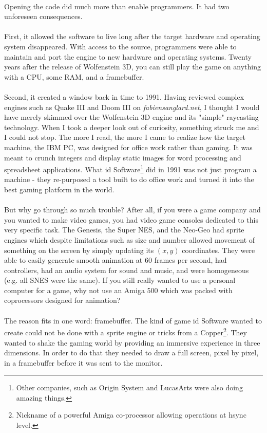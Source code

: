 \\
Opening the code did much more than enable programmers. It had two unforeseen consequences.\\
\\
First, it allowed the software to live long after the target hardware and operating system disappeared. With access to the source, programmers were able to maintain and port the engine to new hardware and operating systems. Twenty years after the release of Wolfenstein 3D, you can still play the game on anything with a CPU, some RAM, and a framebuffer. \\
\\
Second, it created a window back in time to 1991. Having reviewed complex engines such as Quake III and Doom III on \emph{fabiensanglard.net}, I thought I would have merely skimmed over the Wolfenstein 3D engine and its "simple" raycasting technology. When I took a deeper look out of curiosity, something struck me and I could not stop. The more I read, the more I came to realize how the target machine, the IBM PC, was designed for office work rather than gaming. It was meant to crunch integers and display static images for word processing and spreadsheet applications. 
What id Software\footnote{Other companies, such as Origin System and LucasArts were also doing amazing things.} did in 1991 was not just program a machine - they re-purposed a tool built to do office work and turned it into the best gaming platform in the world.\\
\\
But why go through so much trouble? After all, if you were a game company and you wanted to make video games, you had video game consoles dedicated to this very specific task. The Genesis, the Super NES, and the Neo-Geo had sprite engines\label{sprite_engine_ref} which despite limitations such as size and number allowed movement of something on the screen by simply updating its $(x,y)$ coordinates. They were able to easily generate smooth animation at 60 frames per second, had controllers, had an audio system for sound and music, and were homogeneous (e.g. all SNES were the same). If you still really wanted to use a personal computer for a game, why not use an Amiga 500 which was packed with coprocessors designed for animation?\\
\\
The reason fits in one word: framebuffer. The kind of game id Software wanted to create could not be done with a sprite engine or tricks from a Copper\footnote{Nickname of a powerful Amiga co-processor allowing operations at hsync level.}. They wanted to shake the gaming world by providing an immersive experience in three dimensions. In order to do that they needed to draw a full screen, pixel by pixel, in a framebuffer before it was sent to the monitor. \\
